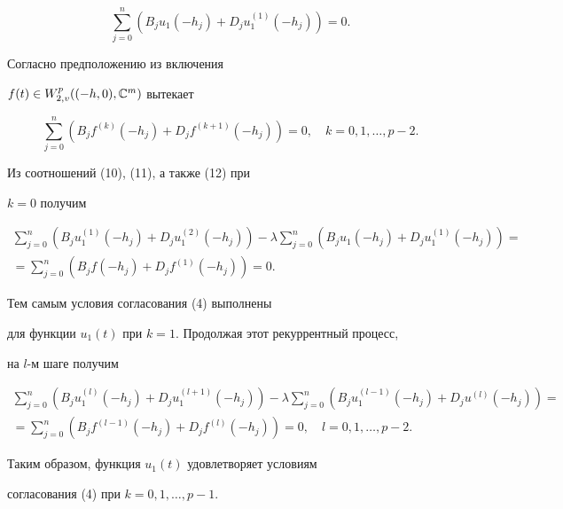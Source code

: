 \begin{pf}
\begin{equation}
\sum^n_{j=0}(B_j u_1(-h_j)+D_j u^{(1)}_1(-h_j))=0. 


\end{equation} 


Согласно предположению из включения 


$f(t)\in W^p_{2,v}((-h,0),\Bbb C^m)$ вытекает


\begin{equation} 


\sum^n_{j=0}(B_j f^{(k)}(-h_j)+D_j f^{(k+1)}(-h_j))=0, 


\quad k=0,1,\dotsc,p-2. 


\end{equation} 


Из соотношений (10), (11), а также (12) при 


$k=0$ получим


\begin{multline*} 


\sum^n_{j=0}(B_j u^{(1)}_1(-h_j)+D_j u^{(2)}_1(-h_j))-\lambda 


\sum^n_{j=0}(B_j u_1(-h_j)+D_j u^{(1)}_1(-h_j))= \\ 


% 


=\sum^n_{j=0}(B_j f(-h_j)+D_j f^{(1)}(-h_j))=0. 


\end{multline*} 


Тем самым условия согласования (4) выполнены 


для функции $u_1(t)$ при $k=1$. Продолжая этот рекуррентный процесс, 


на $l$-м шаге получим 


\begin{multline} 


\sum^n_{j=0}(B_j u^{(l)}_1(-h_j)+D_j u^{(l+1)}_1(-h_j))-\lambda 


\sum^n_{j=0}(B_j u^{(l-1)}_1(-h_j)+D_j u^{(l)}(-h_j))= \\ 


% 


=\sum^n_{j=0}(B_j f^{(l-1)}(-h_j)+D_j f^{(l)}(-h_j))=0,\quad 


l=0,1,\dotsc,p-2. 


\end{multline} 


Таким образом, функция $u_1(t)$ удовлетворяет условиям 


согласования (4) при $k=0,1,\dotsc,p-1$. 


 



\end{pf}
